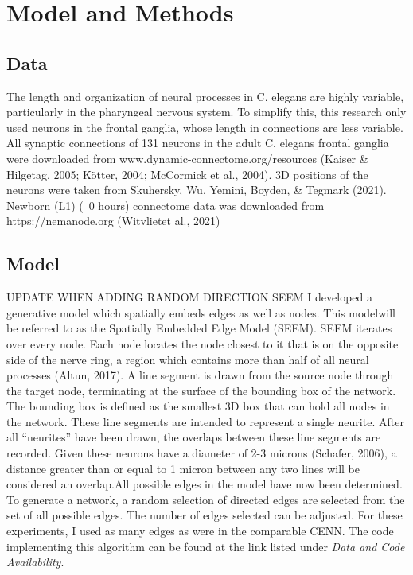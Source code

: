 \section{Model and Methods}
\subsection{Data}
The length and organization of neural processes in C. elegans are highly variable, particularly in the pharyngeal nervous system. To simplify this, this research only used neurons in the frontal ganglia, whose length in connections are less variable. All synaptic connections of 131 neurons in the adult C. elegans frontal ganglia were downloaded from www.dynamic-connectome.org/resources (Kaiser \& Hilgetag, 2005; Kötter, 2004; McCormick et al., 2004). 3D positions of the neurons were taken from Skuhersky, Wu, Yemini, Boyden, \& Tegmark (2021). Newborn (L1) (~0 hours) connectome data was downloaded from https://nemanode.org (Witvlietet al., 2021)
\subsection{Model}
UPDATE WHEN ADDING RANDOM DIRECTION SEEM I developed a generative model which spatially embeds edges as well as nodes. This modelwill be referred to as the Spatially Embedded Edge Model (SEEM). SEEM iterates over every node. Each node locates the node closest to it that is on the opposite side of the nerve ring, a region which contains more than half of all neural processes (Altun, 2017). A line segment is drawn from the source node through the target node, terminating at the surface of the bounding box of the network. The bounding box is defined as the smallest 3D box that can hold all nodes in the network. These line segments are intended to represent a single neurite. After all “neurites” have been drawn, the overlaps between these line segments are recorded. Given these neurons have a diameter of 2-3 microns (Schafer, 2006), a distance greater than or equal to 1 micron between any two lines will be considered an overlap.All possible edges in the model have now been determined. To generate a network, a random selection of directed edges are selected from the set of all possible edges. The number of edges selected can be adjusted. For these experiments, I used as many edges as were in the comparable CENN. The code implementing this algorithm can be found at the link listed under \textit{Data and Code Availability}.
